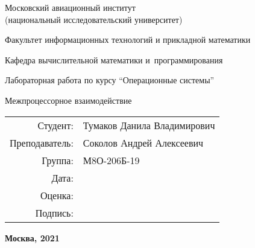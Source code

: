 \begin{titlepage}
\begin{center}
\bfseries

{\Large Московский авиационный институт\\ (национальный исследовательский университет)}

\vspace{48pt}

{\large Факультет информационных технологий и прикладной математики
}

{\large Кафедра вычислительной математики и~программирования}


\vspace{48pt}

Лабораторная работа  по курсу \enquote{Операционные системы}

\vspace{24pt}

{\Large Межпроцессорное взаимодействие}

\end{center}

\vspace{72pt}

\begin{flushright}
\begin{tabular}{rl}
Студент: & Тумаков Данила Владимирович\\
Преподаватель: & Соколов Андрей Алексеевич  \\
Группа: & М8О-206Б-19 \\
Дата: & \\
Оценка: & \\
Подпись: & \\
\end{tabular}
\end{flushright}

\vfill

\begin{center}
\bfseries
Москва, 2021
\end{center}
\end{titlepage}

\pagebreak
